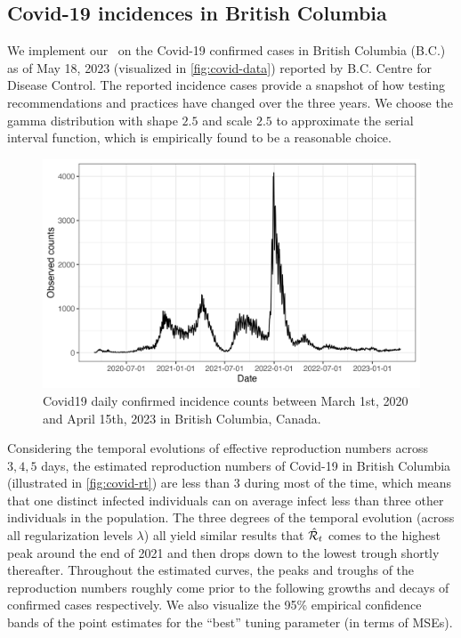 \subsection{Covid-19 incidences in British Columbia}

We implement our \RtEstim\ on the Covid-19 confirmed cases in British Columbia (B.C.) as of May 18, 2023 (visualized in \autoref{fig:covid-data}) reported by B.C. Centre for Disease Control. The reported incidence cases provide a snapshot of how testing recommendations and practices have changed over the three years. We choose the gamma distribution with shape $2.5$ and scale $2.5$ to approximate the serial interval function, which is empirically found to be a reasonable choice. 
\begin{figure}[tb]
    \centering
    \includegraphics[width=0.99\linewidth]{fig/covid_dat.png}
    \caption{Covid19 daily confirmed incidence counts between March 1st, 2020 and April 15th, 2023 in British Columbia, Canada.} 
    \label{fig:covid-data}
\end{figure} 

Considering the temporal evolutions of effective reproduction numbers across $3, 4, 5$ days, the estimated reproduction numbers of Covid-19 in British Columbia (illustrated in \autoref{fig:covid-rt}) are less than $3$ during most of the time, which means that one distinct infected individuals can on average infect less than three other individuals in the population. The three degrees of the temporal evolution (across all regularization levels $\lambda$) all yield similar results that $\hat{\mathcal{R}}_t$ comes to the highest peak around the end of 2021 and then drops down to the lowest trough shortly thereafter. Throughout the estimated curves, the peaks and troughs of the reproduction numbers roughly come prior to the following growths and decays of confirmed cases respectively.
We also visualize the 95\% empirical confidence bands of the point estimates for the ``best'' tuning parameter (in terms of MSEs). 

